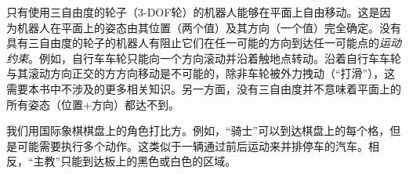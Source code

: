 
只有使用三自由度的轮子（3-DOF轮）的机器人能够在平面上自由移动。这是因为机器人在平面上的姿态由其位置（两个值）及其方向（一个值）完全确定。没有具有三自由度的轮子的机器人有阻止它们在任一可能的方向到达任一可能点的\emph{运动约束}。例如，自行车车轮只能向一个方向滚动并沿着触地点转动。沿着自行车车轮与其滚动方向正交的方方向移动是不可能的，除非车轮被外力拽动（“打滑”），这需要本书中不涉及的更多相关知识。另一方面，没有三自由度并不意味着平面上的所有姿态（位置+方向）都达不到。


我们用国际象棋棋盘上的角色打比方。例如，“骑士”可以到达棋盘上的每个格，但是可能需要执行多个动作。这类似于一辆通过前后运动来并排停车的汽车。相反，“主教”只能到达板上的黑色或白色的区域。


